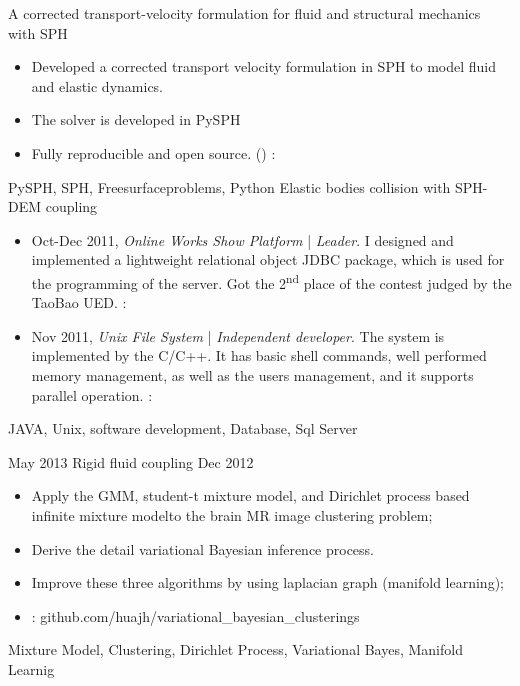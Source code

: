 %
%



\begin{experiences}
  \experience
  {} {A corrected transport-velocity formulation for fluid and structural mechanics with SPH}{}{}
  {}    {
    \begin{itemize}
    \item Developed a corrected transport velocity formulation in SPH to model
      fluid and elastic dynamics.
    \item The solver is developed in PySPH %
    \item Fully reproducible and open source. ()
      \faGithub: 
    \end{itemize}
  }
  {PySPH, SPH, Freesurfaceproblems, Python}
  \emptySeparator
  \experience
  {} {Elastic bodies collision with SPH-DEM coupling}{}{}
  {}    {
    \begin{itemize}
    \item Oct-Dec 2011, \emph{Online Works Show Platform} | \emph{Leader}. I designed and implemented a lightweight
      relational object JDBC package, which is used for the programming of the server.
      Got the 2\textsuperscript{nd} place of the contest judged by the TaoBao UED.
      \faGithub: 
    \item Nov 2011, \emph{Unix File System} | \emph{Independent developer}. The system is implemented by the C/C++. It has basic shell commands, well performed
      memory management,  as well as the users management, and it supports parallel operation.
      \faGithub: 
    \end{itemize}
  }
  {JAVA, Unix, software development, Database, Sql Server}

  \emptySeparator
  \experience
  {May 2013} {Rigid fluid coupling}{}{}
  {Dec 2012 }    {
    \begin{itemize}
    \item Apply the GMM, student-t mixture model, and Dirichlet process based infinite mixture modelto the brain MR image clustering problem;
    \item Derive the detail variational Bayesian inference process.
    \item Improve these three algorithms by using laplacian graph (manifold learning);
    \item \faGithub:  {github.com/huajh/variational\_bayesian\_clusterings}
    \end{itemize}
  }
  {Mixture Model, Clustering, Dirichlet Process, Variational Bayes, Manifold Learnig}


\end{experiences}
